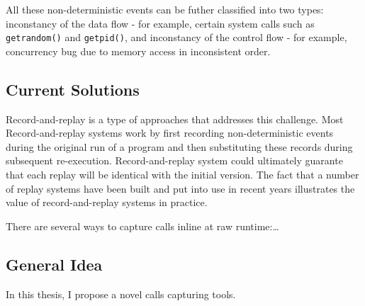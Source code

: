 All these non-deterministic events can be futher classified into two types:
inconstancy of the data flow - for example, certain system calls such as
\texttt{getrandom()} and \texttt{getpid()}, and inconstancy of the control flow
- for example, concurrency bug due to memory access in inconsistent order. 



\subsection{Current Solutions}

Record-and-replay is a type of approaches that addresses this challenge. Most
Record-and-replay systems work by first recording non-deterministic events
during the original run of a program and then substituting these records during
subsequent re-execution. Record-and-replay system could ultimately guarante that
each replay will be identical with the initial version. The fact that a number
of replay systems have been built and put into use in recent years illustrates
the value of record-and-replay systems in practice.\cite{203227}

There are several ways to capture calls inline at raw runtime:\dots

\subsection{General Idea}
In this thesis, I propose a novel calls capturing tools.

